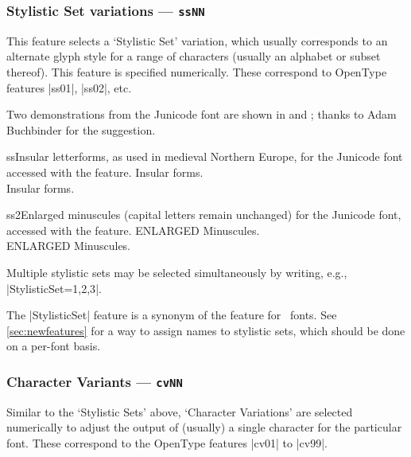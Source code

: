 \subsubsection{Stylistic Set variations --- \texttt{ssNN}}

This feature selects a `Stylistic Set' variation,
which usually corresponds to an alternate glyph style for a range of
characters (usually an alphabet or subset thereof).
This feature is specified numerically. These correspond to OpenType
features |ss01|, |ss02|, etc.

Two demonstrations from the Junicode
font
are shown in  and ; thanks to Adam
Buchbinder for the suggestion.

\begin{Lexample}{ss}{Insular letterforms, as used in medieval Northern Europe, for the Junicode font accessed with the  feature.}
   Insular forms. \\
   Insular forms. \\
\end{Lexample}

\begin{Lexample}{ss2}{Enlarged minuscules (capital letters remain unchanged) for the Junicode font, accessed with the  feature.}
   ENLARGED Minuscules. \\
   ENLARGED Minuscules. \\
\end{Lexample}

Multiple stylistic sets may be selected simultaneously by writing, e.g.,
|StylisticSet={1,2,3}|.

The |StylisticSet| feature is a synonym of the  feature for \AAT\ fonts.
See \vref{sec:newfeatures} for a way to assign names to stylistic sets, which should be done on a per-font basis.

\subsubsection{Character Variants --- \texttt{cvNN}}

Similar to the `Stylistic Sets' above, `Character Variations' are selected
numerically to adjust the output of (usually) a single character for the
particular font. These correspond to the OpenType features |cv01| to |cv99|.


